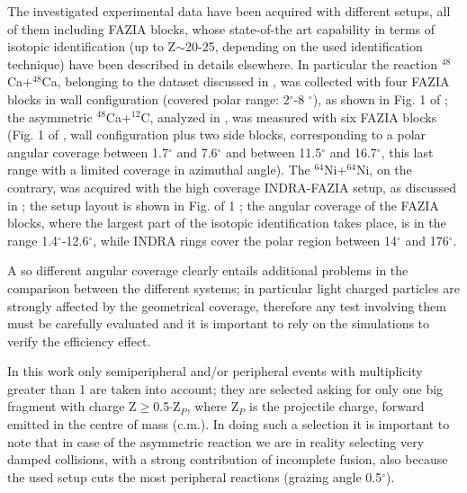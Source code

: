 \documentclass[twocolumn,showpacs,superscriptaddress,aps,prc,10pt,nofootinbib]{revtex4-1}
\begin{document}
The investigated experimental data have been acquired with different setups, all of them including FAZIA blocks, whose state-of-the art capability in terms of isotopic identification (up to Z$\sim$20-25, depending on the used identification technique) have been described in details elsewhere\cite{BougaultFAZIA,ValdreFazia,PastoreNIM,Pasquali2014,Carboni}. In particular the reaction $^{48}$Ca+$^{48}$Ca, belonging to the dataset discussed in \cite{Camaiani2021}, was collected with four FAZIA blocks in wall configuration (covered polar range: 2$^{\circ}$-8 $^{\circ}$), as shown in Fig. 1 of  \cite{Camaiani2021}; the asymmetric $^{48}$Ca+$^{12}$C, analyzed in \cite{FAZIAPRE}, was measured with six FAZIA blocks (Fig. 1 of \cite{FAZIAPRE}, wall configuration plus two side blocks, corresponding to a polar angular coverage between 1.7$^{\circ}$ and 7.6$^{\circ}$ and between 11.5$^{\circ}$ and 16.7$^{\circ}$, this last range with a limited coverage in azimuthal angle). The $^{64}$Ni+$^{64}$Ni, on the contrary, was acquired with the high coverage INDRA-FAZIA setup, as discussed in \cite{Ciampi2022}; the setup layout is shown in Fig. of 1 \cite{Ciampi2022}; the angular coverage of the FAZIA blocks, where the largest part of the isotopic identification takes place, is in the range 1.4$^{\circ}$-12.6$^{\circ}$, while INDRA rings\cite{INDRA1999} cover the polar region between 14$^{\circ}$ and 176$^{\circ}$.

A so different angular coverage clearly entails additional problems in the comparison between the different systems; in particular light charged particles are strongly affected by the geometrical coverage, therefore any test involving them must be carefully evaluated and it is important to rely on the simulations to verify the efficiency effect.

In this work only semiperipheral and/or peripheral events with multiplicity greater than 1 are taken into account; they are selected asking for only one big fragment with charge Z$\geq$0.5$\cdot$Z$_{P}$, where Z$_P$ is the projectile charge, forward emitted in the centre of mass (c.m.). In doing such a selection it is important to note that in case of the asymmetric reaction we are in reality selecting very damped collisions, with a strong contribution of incomplete fusion, also because the used setup cuts the most peripheral reactions (grazing angle 0.5$^{\circ}$).
\end{document}
